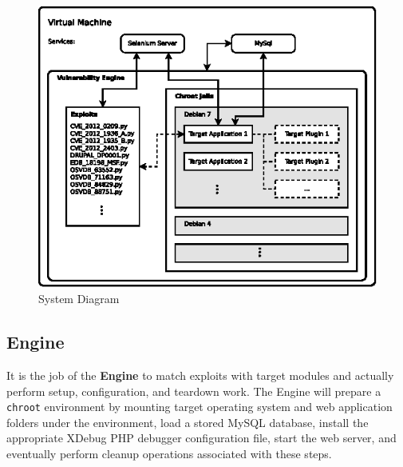 \documentclass[letterpaper,twocolumn,10pt]{article}
\begin{document}
\begin{figure}[!tp]
\label{fig:diagram}
\begin{center}
\includegraphics[scale=1.17]{system_diagram.eps}
\end{center}
\caption{System Diagram}
\end{figure}


\subsection{Engine}
It is the job of the {\bf Engine} to match exploits with target modules and actually perform setup, configuration, and teardown work. The Engine will prepare a \texttt{chroot} environment by mounting target operating system and web application folders under the environment, load a stored MySQL database, install the appropriate XDebug PHP debugger configuration file, start the web server, and eventually perform cleanup operations associated with these steps. 
\end{document}

